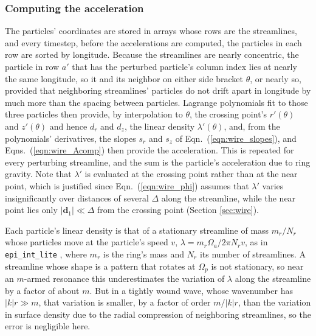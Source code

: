 \documentclass[twocolumn]{aastex702}
\newcommand{\code}[1]{\texttt{#1}}   %
\begin{document}
\subsubsection{Computing the acceleration}
\label{sec:wire_code}

The particles' coordinates are stored in arrays whose rows
are the streamlines, and every timestep, before the accelerations are computed, the particles in each
row are sorted by longitude. Because the streamlines are nearly concentric, the particle in row $a'$
that has the perturbed particle's column index lies at nearly the same longitude, so it and its
neighbor on either side bracket $\theta$, or nearly so, provided that neighboring streamlines' particles do
not drift apart in longitude by much more than the spacing between particles.
Lagrange polynomials fit to those three particles then provide, by interpolation to $\theta$, the
crossing point's $r'(\theta)$ and $z'(\theta)$ and hence $d_r$ and $d_z$, the linear density
$\lambda'(\theta)$, and, from the polynomials' derivatives, the slopes $s_r$ and $s_z$ of
Eqn.\ (\ref{eqn:wire_slopes}), and Eqns.\ (\ref{eqn:wire_Acomp}) then provide the
acceleration. This is repeated for every perturbing streamline, and the sum is the particle's acceleration due to
ring gravity. Note that $\lambda'$ is evaluated at the crossing point rather than at the near point,
which is justified since Eqn.\ (\ref{eqn:wire_phi}) assumes that $\lambda'$ varies insignificantly over
distances of several $\Delta$ along the streamline, while the near point lies only
$|\mathbf{d}_1| \ll \Delta$ from the crossing point (Section \ref{sec:wire}).

Each particle's linear density is that of a stationary streamline of mass $m_r/N_r$ whose particles move at the
particle's speed $v$, $\lambda = m_r\Omega_a/2\pi N_rv$, as in \code{epi\_int\_lite} \citep{H25}, where $m_r$ is the
ring's mass and $N_r$ its number of streamlines. A streamline whose shape is a pattern that rotates at $\Omega_p$ is not
stationary, so near an $m$-armed resonance this underestimates the variation of $\lambda$ along the streamline by a
factor of about $m$. But in a tightly wound wave, whose wavenumber has $|k|r \gg m$, that variation is smaller, by a
factor of order $m/|k|r$, than the variation in surface density due to the radial compression of neighboring
streamlines, so the error is negligible here.
\end{document}

